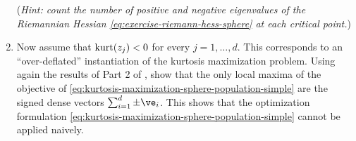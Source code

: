 \documentclass[../../book-main.tex]{subfiles}
\begin{document}
\begin{exercise}
\begin{enumerate}
        (\textit{Hint: count the number of positive and negative eigenvalues of the Riemannian Hessian \eqref{eq:exercise-riemann-hess-sphere} at each critical point.})
        \item Now assume that $\mathop{\mathrm{kurt}}(z_j) < 0$ for every $j =1, \dots, d$. This corresponds to an ``over-deflated'' instantiation of the kurtosis maximization problem. Using again the results of Part 2 of , show that the only local maxima of the objective of \eqref{eq:kurtosis-maximization-sphere-population-simple} are the signed dense vectors $\sum_{i=1}^d \pm \ve_i$.
        This shows that the optimization formulation \eqref{eq:kurtosis-maximization-sphere-population-simple} cannot be applied naively.
    \end{enumerate}
\end{exercise}
\end{document}
